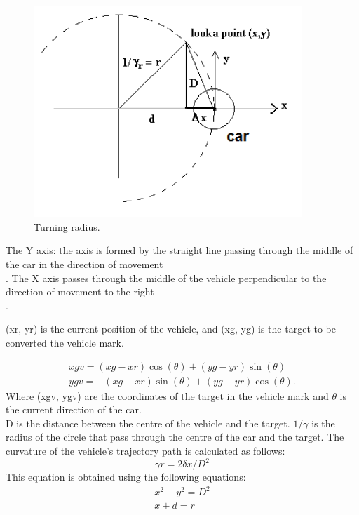 \documentclass{llncs}
\begin{document}
\begin{figure}[h!]
	
	\centering
	\includegraphics[width=0.9\textwidth]{fig/salm2.PNG}
	
	
	\begin{minipage}{10cm}
		\centering
		\caption{\footnotesize Turning radius.}
		\label{fig05}
	\end{minipage} 
	
\end{figure}

The Y axis: the axis is formed by the straight line passing through the middle of the car in the direction of movement \\.	
The X axis passes through the middle of the vehicle perpendicular to the direction of movement to the right \\.

(xr, yr) is the current position of the vehicle, and (xg, yg) is the target to be  converted the vehicle mark.

\begin{gather}
xgv = (xg - xr)\cos(\theta)+ (yg-yr)\sin(\theta)\\
ygv = -(xg - xr)\sin(\theta) + (yg-yr)\cos(\theta).
\end{gather}
Where (xgv, ygv) are the coordinates of the target in the vehicle mark and $\theta $ is the current direction of the car.\\
D is the distance between the centre of the vehicle and the target.  $1 /\gamma$ is the radius of the circle that pass through the centre of the car and the target.
The curvature of the vehicle's trajectory path is calculated as follows:
\begin{equation}	
\gamma r = 2\delta x/D^2		
\end{equation}
This equation is obtained using the following equations:
\begin{gather}
x^2 + y^2 = D^2	\\
x + d = r  
\end{gather}
\end{document}
